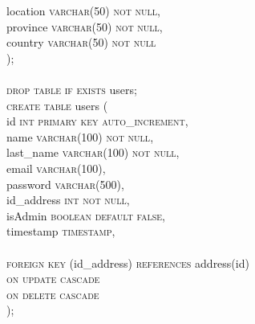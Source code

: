 \documentclass{article}
\begin{document}
   \phantom{abc} location \textsc{\textcolor{sentence}{varchar\textcolor{numberSQL}{(50)} not null}},\\
   \phantom{abc} province \textsc{\textcolor{sentence}{varchar\textcolor{numberSQL}{(50)} not null}},\\
   \phantom{abc} country \textsc{\textcolor{sentence}{varchar\textcolor{numberSQL}{(50)} not null}}\\);\\\\
\textsc{\textcolor{sentence}{drop table if exists}} users;\\
\textsc{\textcolor{sentence}{create table}} users (\\
\phantom{abc} id \textsc{\textcolor{sentence}{int primary key auto\_increment}},\\
\phantom{abc} name \textsc{\textcolor{sentence}{varchar\textcolor{numberSQL}{(100)} not null}},\\
\phantom{abc} last\_name \textsc{\textcolor{sentence}{varchar\textcolor{numberSQL}{(100)} not null}},\\
\phantom{abc} email \textsc{\textcolor{sentence}{varchar\textcolor{numberSQL}{(100)}}},\\
\phantom{abc} password \textsc{\textcolor{sentence}{varchar\textcolor{numberSQL}{(500)}}},\\
\phantom{abc} id\_address \textsc{\textcolor{sentence}{int not null}},\\
\phantom{abc} isAdmin \textsc{\textcolor{sentence}{boolean default false}},\\

\phantom{abc} timestamp \textsc{\textcolor{sentence}{timestamp}},\\\\
\phantom{abc} \textsc{\textcolor{sentence}{foreign key}} (id\_address) \textsc{\textcolor{sentence}{references}} address(id)\\
\phantom{abc} \textsc{\textcolor{sentence}{on update cascade}}\\
\phantom{abc} \textsc{\textcolor{sentence}{on delete  cascade}}\\
);

\newpage
\end{document}
